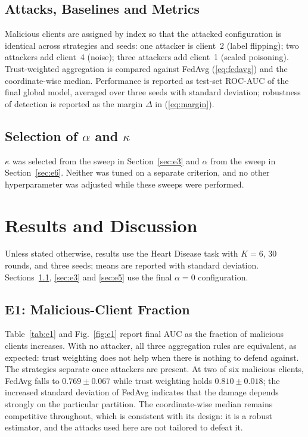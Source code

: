 \documentclass[conference]{IEEEtran}
\begin{document}
\subsection{Attacks, Baselines and Metrics}
Malicious clients are assigned by index so that the attacked configuration is
identical across strategies and seeds: one attacker is client~2 (label
flipping); two attackers add client~4 (noise); three attackers add client~1
(scaled poisoning). Trust-weighted aggregation is compared against FedAvg
(\ref{eq:fedavg}) and the coordinate-wise median.
Performance is reported as test-set ROC-AUC of the final global model,
averaged over three seeds with standard deviation; robustness of detection is
reported as the margin $\Delta$ in (\ref{eq:margin}).

\subsection{Selection of $\alpha$ and $\kappa$}
$\kappa$ was selected from the sweep in Section~\ref{sec:e3} and $\alpha$
from the sweep in Section~\ref{sec:e6}. Neither was tuned on a separate
criterion, and no other hyperparameter was adjusted while these sweeps were
performed.

\section{Results and Discussion}

Unless stated otherwise, results use the Heart Disease task with $K=6$,
30 rounds, and three seeds; means are reported with standard deviation.
Sections~\ref{sec:e1}, \ref{sec:e3} and \ref{sec:e5} use the final
$\alpha=0$ configuration.

\subsection{E1: Malicious-Client Fraction}
\label{sec:e1}
Table~\ref{tab:e1} and Fig.~\ref{fig:e1} report final AUC as the fraction of
malicious clients increases. With no attacker, all three aggregation rules
are equivalent, as expected: trust weighting does not help when there is
nothing to defend against. The strategies separate once attackers are
present. At two of six malicious clients, FedAvg falls to
$0.769 \pm 0.067$ while trust weighting holds $0.810 \pm 0.018$; the
increased standard deviation of FedAvg indicates that the damage depends
strongly on the particular partition. The coordinate-wise median remains
competitive throughout, which is consistent with its design: it is a robust
estimator, and the attacks used here are not tailored to defeat it.
\end{document}
